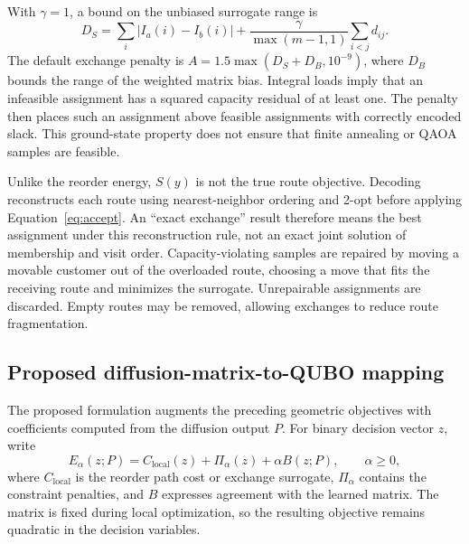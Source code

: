 \documentclass[11pt,a4paper]{article}
\begin{document}
With $\gamma=1$, a bound on the unbiased surrogate range is
\begin{equation}
 D_S=\sum_i|I_a(i)-I_b(i)|
 +\frac{\gamma}{\max(m-1,1)}\sum_{i<j}d_{ij}.
 \label{eq:exchange-span}
\end{equation}
The default exchange penalty is $A=1.5\max(D_S+D_B,10^{-9})$, where
$D_B$ bounds the range of the weighted matrix bias. Integral loads imply
that an infeasible assignment has a squared capacity residual of at
least one. The penalty then places such an assignment above feasible
assignments with correctly encoded slack. This ground-state property
does not ensure that finite annealing or QAOA samples are feasible.

Unlike the reorder energy, $S(y)$ is not the true route objective. Decoding
reconstructs each route using nearest-neighbor ordering and 2-opt before
applying Equation~\eqref{eq:accept}. An ``exact exchange'' result therefore
means the best assignment under this reconstruction rule, not an exact joint
solution of membership and visit order. Capacity-violating samples are
repaired by moving a movable customer out of the overloaded route,
choosing a move that fits the receiving route and minimizes the surrogate.
Unrepairable assignments are discarded. Empty routes may be removed,
allowing exchanges to reduce route fragmentation.

\subsection{Proposed diffusion-matrix-to-QUBO mapping}
\label{sec:matrix-qubo}

The proposed formulation augments the preceding geometric objectives with
coefficients computed from the diffusion output $P$. For binary decision
vector $z$, write
\begin{equation}
 E_\alpha(z;P)=C_{\mathrm{local}}(z)+\Pi_\alpha(z)+\alpha B(z;P),
 \qquad \alpha\geq 0,
 \label{eq:diffusion-qubo}
\end{equation}
where $C_{\mathrm{local}}$ is the reorder path cost or exchange surrogate,
$\Pi_\alpha$ contains the constraint penalties, and $B$ expresses agreement
with the learned matrix. The matrix is fixed during local optimization, so
the resulting objective remains quadratic in the decision variables.
\end{document}
